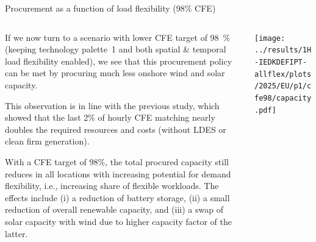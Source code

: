 \begin{frame}{Procurement as a function of load flexibility (98\% CFE)}
  \label{cfe98portfolio}

  {\footnotesize
  \vspace{0.2cm}
  
  \begin{columns}[T]

  \begin{column}{6cm}
  If we now turn to a scenario with \alert{lower CFE target of 98~\%} (keeping technology palette~1 and both spatial \& temporal load flexibility enabled), we see that this procurement policy can be met by procuring much less onshore wind and solar capacity.
  
  \vspace{0.1cm}
  This observation is in line with the previous study, which showed that the last 2\% of hourly CFE matching nearly doubles the required resources and costs (without LDES or clean firm generation).

  \vspace{0.1cm}
  With a CFE target of 98\%, the total procured capacity still reduces in all locations with increasing potential for demand flexibility, i.e., increasing share of flexible workloads. The effects include (i) a reduction of battery storage, (ii) a small reduction of overall renewable capacity, and (iii) a swap of solar capacity with wind due to higher capacity factor of the latter. 
  
  \end{column}

  \begin{column}{9cm}
    \centering
    \texttt{[image: ../results/1H-IEDKDEFIPT-allflex/plots/2025/EU/p1/cfe98/capacity.pdf]}
  \end{column}
  \end{columns}
  }
  \end{frame}


